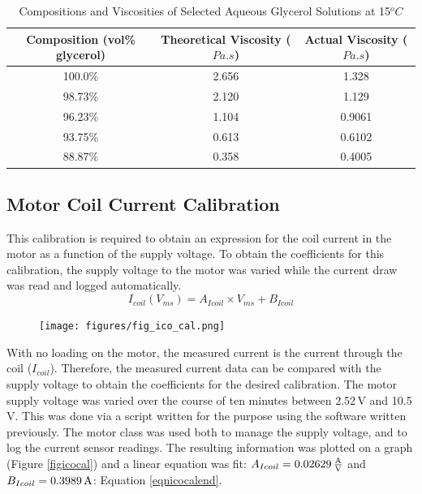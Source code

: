 \documentclass[twoside,a4]{report}
\begin{document}
	\begin{table}
		\centering
		\caption{Compositions and Viscosities of Selected Aqueous Glycerol Solutions at 15$^o C$}
		\label{tabreffluvisc}
		\begin{tabular}{| c | c | c |}
			\hline
			Composition (vol\% glycerol) & Theoretical Viscosity ($Pa.s$) & Actual Viscosity ($Pa.s$)\\
			\hline
			100.0\% & 2.656 & 1.328 \\
			98.73\% & 2.120 & 1.129 \\
			96.23\% & 1.104 & 0.9061 \\
			93.75\% & 0.613 & 0.6102 \\
			88.87\% & 0.358 & 0.4005 \\
			\hline
		\end{tabular}
	\end{table}
	
	\subsection*{Motor Coil Current Calibration}
	This calibration is required to obtain an expression for the coil current in the motor as a function of the supply voltage. To obtain the coefficients for this calibration, the supply voltage to the motor was varied while the current draw was read and logged automatically.
	\begin{equation}
	I_{coil} (V_{ms}) = A_{Icoil} \times V_{ms} + B_{Icoil}
	\label{eqnicocalmid}
	\end{equation}
	
	\begin{figure}[!htb]
		\centering
		\texttt{[image: figures/fig\_ico\_cal.png]}
		\caption{Coil Current Calibration Results}
		\label{figicocal}
		\begin{subfigure}{0.9\textwidth}
			\footnotesize 
		\end{subfigure}
	\end{figure}
	
	\noindent
	With no loading on the motor, the measured current is the current through the coil ($I_{coil}$). Therefore, the measured current data can be compared with the supply voltage to obtain the coefficients for the desired calibration. The motor supply voltage was varied over the course of ten minutes between 2.52\,V and 10.5\,V. This was done via a script written for the purpose using the software written previously. The motor class was used both to manage the supply voltage, and to log the current sensor readings. The resulting information was plotted on a graph (Figure \ref{figicocal}) and a linear equation was fit: $A_{Icoil} = 0.02629\,\rm\frac{A}{V}$ and $B_{Icoil} = 0.3989\,\rm A$: Equation \ref{eqnicocalend}.
	
\end{document}
